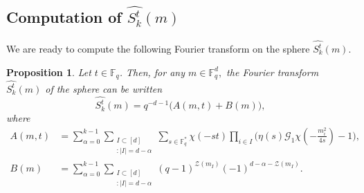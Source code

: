 \documentclass[a4paper,11pt]{amsart}
\numberwithin{equation}{section}
\newtheorem{proposition}[theorem]{Proposition}
\def\Fq#1{\mathbb{F}_q^{#1}}
\begin{document}
\subsection{Computation of $\widehat{S_{k}^t} (m)$}
We are ready to compute the following Fourier transform on the sphere $\widehat{S_{k}^t} (m)$.
\begin{proposition}\label{FSF} Let $t\in \mathbb F_q$. Then, for any $m\in \mathbb F_q^d,$ the Fourier transform $\widehat{S_{k}^t} (m)$ of the sphere can be written
$$\widehat{S_{k}^t} (m)=q^{-d-1} \bigg(A(m,t)+B(m)\bigg),$$
where 
\begin{align*}
    A(m,t) &=\sum_{\alpha = 0}^{k-1}\sum_{\substack{{I \subset [d]}\\{:|I| = d-\alpha}}}\sum_{s\in\Fq{*}}\chi(-st)\prod_{i \in I}\bigg(\eta(s)\mathcal{G}_1\chi\left(-\frac{{m}_i^2}{4s}\right)-1\bigg), \\
    B(m) &= \sum_{\alpha = 0}^{k-1}\sum_{\substack{{I \subset [d]}\\{:|I| = d-\alpha}}}(q-1)^{\mathcal{Z}(m_{I})}(-1)^{d-\alpha-\mathcal{Z}(m_I)}.
\end{align*}
\end{proposition}
\end{document}
